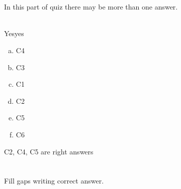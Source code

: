 \documentclass{report}
\begin{document}
\chapter{}
In this part of quiz there may be more than one answer.\\\\

\begin{question}[type=exam]
Yesyes\\
\begin{enumerate}[a)]
\item C4
\item C3
\item C1
\item C2
\item C5
\item C6
\end{enumerate}
\end{question}
\begin{solution}
C2, C4, C5 are right answers
\end{solution}



\chapter{}
Fill gaps writing correct answer.\\\\


\end{document}
